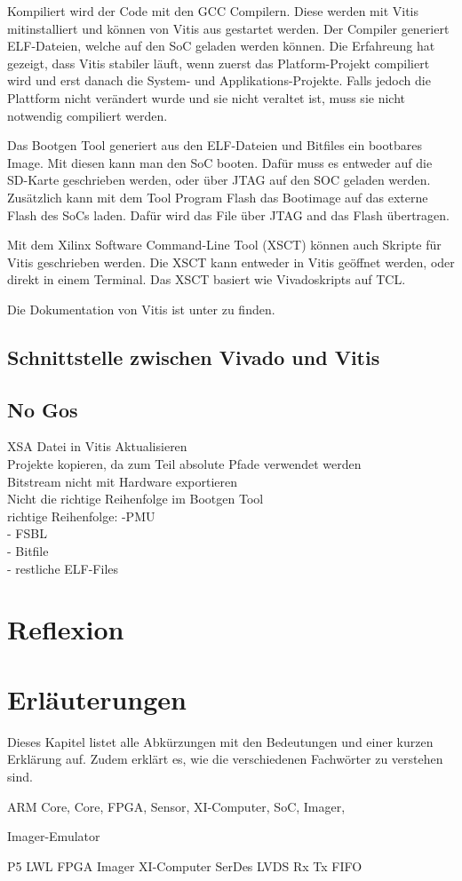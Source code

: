 \documentclass{article}
\begin{document}
Kompiliert wird der Code mit den GCC Compilern. Diese werden mit Vitis mitinstalliert und können von Vitis aus gestartet werden. Der Compiler generiert ELF-Dateien, welche auf den SoC geladen werden können. Die Erfahreung hat gezeigt, dass Vitis stabiler läuft, wenn zuerst das Platform-Projekt compiliert wird und erst danach die System- und Applikations-Projekte. Falls jedoch die Plattform nicht verändert wurde und sie nicht veraltet ist, muss sie nicht notwendig compiliert werden.

Das Bootgen Tool generiert aus den ELF-Dateien und Bitfiles ein bootbares Image. Mit diesen kann man den SoC booten. Dafür muss es entweder auf die SD-Karte geschrieben werden, oder über JTAG auf den SOC geladen werden. Zusätzlich kann mit dem Tool Program Flash das Bootimage auf das externe Flash des SoCs laden. Dafür wird das File über JTAG and das Flash übertragen.

Mit dem Xilinx Software Command-Line Tool (XSCT) können auch Skripte für Vitis geschrieben werden. Die XSCT kann entweder in Vitis geöffnet werden, oder direkt in einem Terminal. Das XSCT basiert wie Vivadoskripts auf TCL.

Die Dokumentation von Vitis ist unter  zu finden.

\subsection{Schnittstelle zwischen Vivado und Vitis}


\subsection{No Gos}
XSA Datei in Vitis Aktualisieren\\
Projekte kopieren, da zum Teil absolute Pfade verwendet werden\\
Bitstream nicht mit Hardware exportieren\\
Nicht die richtige Reihenfolge im Bootgen Tool\\
richtige Reihenfolge: -PMU\\
- FSBL\\
- Bitfile\\
- restliche ELF-Files


\section{Reflexion}



\section{Erläuterungen}
Dieses Kapitel listet alle Abkürzungen mit den Bedeutungen und einer kurzen Erklärung auf. Zudem erklärt es, wie die verschiedenen Fachwörter zu verstehen sind.

ARM Core,
Core,
FPGA,
Sensor,
XI-Computer,
SoC,
Imager,

Imager-Emulator

P5
LWL
FPGA
Imager
XI-Computer
SerDes
LVDS
Rx
Tx
FIFO
\end{document}
